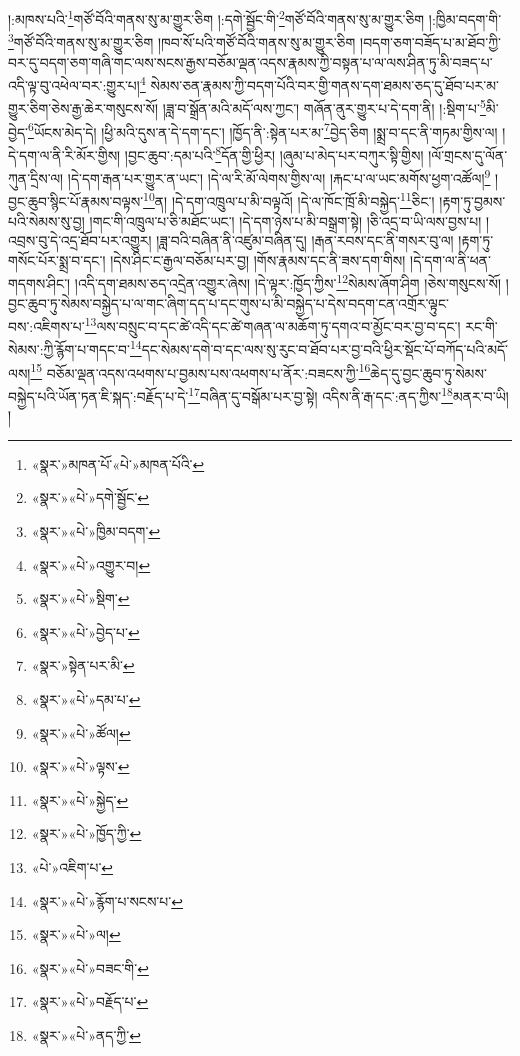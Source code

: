 །:མཁས་པའི་\footnote{«སྣར་»མཁན་པོ་«པེ་»མཁན་པོའི་}གཙོ་བོའི་གནས་སུ་མ་གྱུར་ཅིག །:དགེ་སྦྱོང་གི་\footnote{«སྣར་»«པེ་»དགེ་སྦྱོང་}གཙོ་བོའི་གནས་སུ་མ་གྱུར་ཅིག །:ཁྱིམ་བདག་གི་\footnote{«སྣར་»«པེ་»ཁྱིམ་བདག་}གཙོ་བོའི་གནས་སུ་མ་གྱུར་ཅིག །ཁབ་སོ་པའི་གཙོ་བོའི་གནས་སུ་མ་གྱུར་ཅིག །བདག་ཅག་བཟོད་པ་མ་ཐོབ་ཀྱི་བར་དུ་བདག་ཅག་གཞི་གང་ལས་སངས་རྒྱས་བཅོམ་ལྡན་འདས་རྣམས་ཀྱི་བསྟན་པ་ལ་ལས་ཤིན་ཏུ་མི་བཟད་པ་འདི་ལྟ་བུ་འཕེལ་བར་:གྱུར་པ།\footnote{«སྣར་»«པེ་»འགྱུར་བ།} སེམས་ཅན་རྣམས་ཀྱི་བདག་པོའི་བར་གྱི་གནས་དག་ཐམས་ཅད་དུ་ཐོབ་པར་མ་གྱུར་ཅིག་ཅེས་རྒྱ་ཆེར་གསུངས་སོ། །ཟླ་བ་སྒྲོན་མའི་མདོ་ལས་ཀྱང་། གཞོན་ནུར་གྱུར་པ་དེ་དག་ནི། །:སྡིག་པ་\footnote{«སྣར་»«པེ་»སྡིག་}མི་བྱེད་\footnote{«སྣར་»«པེ་»བྱེད་པ་}ཡོངས་མེད་དེ། །ཕྱི་མའི་དུས་ན་དེ་དག་དང་། །ཁྱོད་ནི་:སྟེན་པར་མ་\footnote{«སྣར་»སྟེན་པར་མི་}བྱེད་ཅིག །སྨྲ་བ་དང་ནི་གཏམ་གྱིས་ལ། །དེ་དག་ལ་ནི་རི་མོར་གྱིས། །བྱང་ཆུབ་:དམ་པའི་\footnote{«སྣར་»«པེ་»དམ་པ་}དོན་གྱི་ཕྱིར། །ཞུམ་པ་མེད་པར་བཀུར་སྟི་གྱིས། །ལོ་གྲངས་དུ་ལོན་ཀུན་དྲིས་ལ། །དེ་དག་རྒན་པར་གྱུར་ན་ཡང་། །དེ་ལ་རི་མོ་ལེགས་གྱིས་ལ། །རྐང་པ་ལ་ཡང་མགོས་ཕྱག་འཚོལ།\footnote{«སྣར་»«པེ་»ཚོལ།} །བྱང་ཆུབ་སྙིང་པོ་རྣམས་བལྟས་\footnote{«སྣར་»«པེ་»ལྟས་}ན། །དེ་དག་འཁྲུལ་པ་མི་བལྟའོ། །དེ་ལ་ཁོང་ཁྲོ་མི་བསྐྱེད་\footnote{«སྣར་»«པེ་»སྐྱེད་}ཅིང་། །རྟག་ཏུ་བྱམས་པའི་སེམས་སུ་བྱ། །གང་གི་འཁྲུལ་པ་ཅི་མཐོང་ཡང་། །དེ་དག་ཉེས་པ་མི་བསྒྲག་སྟེ། །ཅི་འདྲ་བ་ཡི་ལས་བྱས་པ། །འབྲས་བུ་དེ་འདྲ་ཐོབ་པར་འགྱུར། །ཟླ་བའི་བཞིན་ནི་འཛུམ་བཞིན་དུ། །རྒན་རབས་དང་ནི་གསར་བུ་ལ། །རྟག་ཏུ་གསོང་པོར་སྨྲ་བ་དང་། །དེས་ཤིང་ང་རྒྱལ་བཅོམ་པར་བྱ། །གོས་རྣམས་དང་ནི་ཟས་དག་གིས། །དེ་དག་ལ་ནི་ཕན་གདགས་ཤིང་། །འདི་དག་ཐམས་ཅད་འདྲེན་འགྱུར་ཞེས། །དེ་ལྟར་:ཁྱོད་ཀྱིས་\footnote{«སྣར་»«པེ་»ཁྱོད་ཀྱི་}སེམས་ཞོག་ཤིག །ཅེས་གསུངས་སོ། །བྱང་ཆུབ་ཏུ་སེམས་བསྐྱེད་པ་ལ་གང་ཞིག་དད་པ་དང་གུས་པ་མི་བསྐྱེད་པ་དེས་བདག་ངན་འགྲོར་ལྟུང་བས་:འཇིགས་པ་\footnote{«པེ་»འཇིག་པ་}ལས་བསྲུང་བ་དང་ཚེ་འདི་དང་ཚེ་གཞན་ལ་མཆོག་ཏུ་དགའ་བ་མྱོང་བར་བྱ་བ་དང་། རང་གི་སེམས་:ཀྱི་རྙོག་པ་གདང་བ་\footnote{«སྣར་»«པེ་»རྙོག་པ་སངས་པ་}དང་སེམས་དགེ་བ་དང་ལས་སུ་རུང་བ་ཐོབ་པར་བྱ་བའི་ཕྱིར་སྡོང་པོ་བཀོད་པའི་མདོ་ལས།\footnote{«སྣར་»«པེ་»ལ།} བཅོམ་ལྡན་འདས་འཕགས་པ་བྱམས་པས་འཕགས་པ་ནོར་:བཟངས་ཀྱི་\footnote{«སྣར་»«པེ་»བཟང་གི་}ཆེད་དུ་བྱང་ཆུབ་ཏུ་སེམས་བསྐྱེད་པའི་ཡོན་ཏན་ཇི་སྐད་:བརྗོད་པ་དེ་\footnote{«སྣར་»«པེ་»བརྗོད་པ་}བཞིན་དུ་བསྒོམ་པར་བྱ་སྟེ། འདིས་ནི་རྒ་དང་:ནད་ཀྱིས་\footnote{«སྣར་»«པེ་»ནད་ཀྱི་}མནར་བ་ཡི། །
